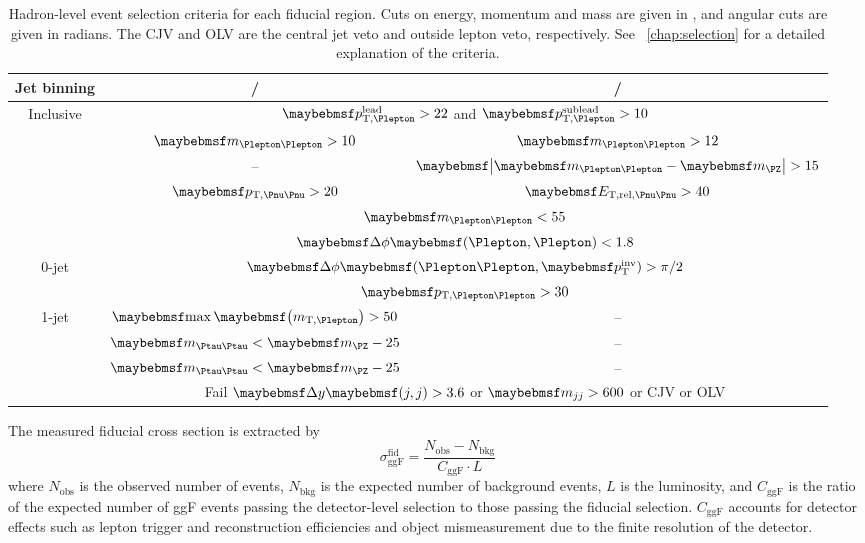 \begin{table}[t]
	\begin{tabular}{ccc}
		\toprule
		Jet binning & \emch/\mech & \eech/\mmch \\
		\midrule
		Inclusive & \multicolumn{2}{c}{$\ptleadlep > 22$ and $\ptsubleadlep > 10$} \\
		& $\mll > 10$ & $\mll > 12$ \\
		& -- & $\mods{\mll - \mZ} > 15$ \\
		& $\truthmet > 20$ & $\truthmetrel > 40$ \\
		& \multicolumn{2}{c}{$\mll < 55$} \\
		& \multicolumn{2}{c}{$\dphill < 1.8$} \\
		\midrule
		0-jet & \multicolumn{2}{c}{$\dphillmet > \pi/2$} \\
		& \multicolumn{2}{c}{$\ptll > 30$} \\
		\midrule
		1-jet & $\maxmtw > 50$ & -- \\
		& $\mtautau < \mZ - 25$ & -- \\
		\midrule
		\twojet & $\mtautau < \mZ - 25$ & -- \\
		& \multicolumn{2}{c}{Fail $\dyjj > 3.6$ or $\mjj > 600$ or CJV or OLV} \\
		\bottomrule
	\end{tabular}
	\caption{Hadron-level event selection criteria for each fiducial region. Cuts on 
	energy, momentum and mass are given in \GeV, and angular cuts are given in radians. The 
	CJV and OLV are the central jet veto and outside lepton veto, respectively. See 
	\Chapter~\ref{chap:selection} for a detailed explanation of the criteria.}
	\label{tab:ggF:fiducial_region}
\end{table}

The measured fiducial cross section is extracted by
\begin{equation}
	\sigma_{\text{ggF}}^{\text{fid}} = \frac{N_{\text{obs}} - N_{\text{bkg}}}{C_{\text{ggF}} \cdot L}
	\label{eq:ggF:fid_xs}
\end{equation}
where $N_{\text{obs}}$ is the observed number of events, $N_{\text{bkg}}$ is the expected 
number of background events, $L$ is the luminosity, and $C_{\text{ggF}}$ is the ratio of 
the expected number of ggF events passing the detector-level selection to those passing 
the fiducial selection. $C_{\text{ggF}}$ accounts for detector effects such as lepton 
trigger and reconstruction efficiencies and object mismeasurement due to the finite 
resolution of the detector.

